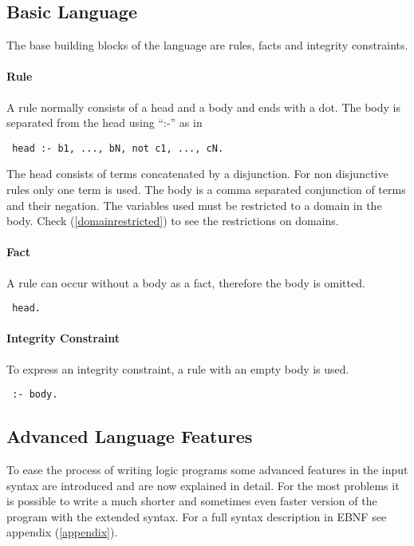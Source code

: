 \documentclass[a4paper,10pt]{article}
\begin{document}
\subsection{Basic Language}
The base building blocks of the language are rules, facts and integrity constraints.
\paragraph{Rule}
A rule normally consists of a head and a body and ends with a dot.
The body is separated from the head using ``:-'' as in
\begin{verbatim}
 head :- b1, ..., bN, not c1, ..., cN.
\end{verbatim}
The head consists of terms concatenated by a disjunction. For non disjunctive rules only one term is used.
The body is a comma separated conjunction of terms and their negation.
The variables used must be restricted to a domain in the body.
Check (\ref{domainrestricted}) to see the restrictions on domains.
\paragraph{Fact}
A rule can occur without a body as a fact, therefore the body is omitted.
\begin{verbatim}
 head.
\end{verbatim}
\paragraph{Integrity Constraint}
To express an integrity constraint, a rule with an empty body is used.
\begin{verbatim}
 :- body.
\end{verbatim}

\subsection{Advanced Language Features}
To ease the process of writing logic programs some advanced features in the input syntax are introduced and are now explained in detail.
For the most problems it is possible to write a much shorter and sometimes even faster version of the program with the extended syntax.
For a full syntax description in EBNF see appendix (\ref{appendix}).
\end{document}
